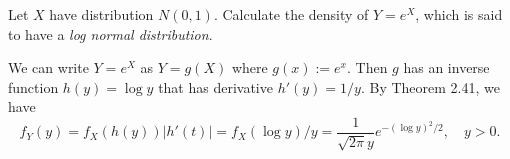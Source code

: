 \begin{exercise}
  Let $X$ have distribution $N(0,1)$. Calculate the density of $Y=e^X$, which is said to have a \textit{log normal distribution}.
\end{exercise}
\begin{solution}
  We can write $Y=e^X$ as $Y=g(X)$ where $g(x):=e^x$. Then $g$ has an inverse function $h(y)=\log y$ that has derivative $h'(y)=1/y$. By Theorem 2.41, we have
  \[
    f_Y(y)=f_X(h(y))|h'(t)| = f_X(\log y)/y = \frac{1}{\sqrt{2\pi}y}e^{-(\log y)^2/2}, \quad y>0.
  \]
\end{solution}
